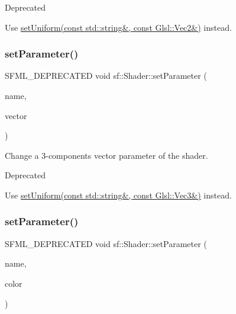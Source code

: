 \begin{DoxyRefDesc}{Deprecated}
\item[\hyperlink{deprecated__deprecated000009}{Deprecated}]Use \hyperlink{classsf_1_1_shader_a4a2c673c41e37b17d67e4af1298b679f}{set\+Uniform(const std\+::string\&, const Glsl\+::\+Vec2\&)} instead.\end{DoxyRefDesc}
\mbox{\label{classsf_1_1_shader_abf1eb5e74f216c7bcfaf34d08c960ee0}} 
\subsubsection{\texorpdfstring{set\+Parameter()}{setParameter()}\hspace{0.1cm}{\footnotesize\ttfamily [6/10]}}
{\footnotesize\ttfamily S\+F\+M\+L\+\_\+\+D\+E\+P\+R\+E\+C\+A\+T\+ED void sf\+::\+Shader\+::set\+Parameter (\begin{DoxyParamCaption}\item[{const std\+::string \&}]{name,  }\item[{const \hyperlink{classsf_1_1_vector3}{Vector3f} \&}]{vector }\end{DoxyParamCaption})}



Change a 3-\/components vector parameter of the shader. 

\begin{DoxyRefDesc}{Deprecated}
\item[\hyperlink{deprecated__deprecated000010}{Deprecated}]Use \hyperlink{classsf_1_1_shader_aad654ad8de6f0c56191fa7b8cea21db2}{set\+Uniform(const std\+::string\&, const Glsl\+::\+Vec3\&)} instead.\end{DoxyRefDesc}
\mbox{\label{classsf_1_1_shader_a66e68e64c06ef5501e50dd5903cab51c}} 
\subsubsection{\texorpdfstring{set\+Parameter()}{setParameter()}\hspace{0.1cm}{\footnotesize\ttfamily [7/10]}}
{\footnotesize\ttfamily S\+F\+M\+L\+\_\+\+D\+E\+P\+R\+E\+C\+A\+T\+ED void sf\+::\+Shader\+::set\+Parameter (\begin{DoxyParamCaption}\item[{const std\+::string \&}]{name,  }\item[{const \hyperlink{classsf_1_1_color}{Color} \&}]{color }\end{DoxyParamCaption})}



